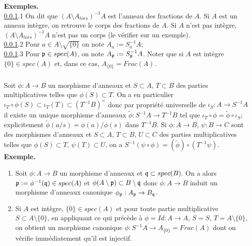 \documentclass[a4paper, 12pt]{amsart}
\begin{document}
 
 
 \subsubsection{}\label{LocEx2}\textbf{Exemples.}\\

\noindent\ref{LocEx2}.1 On dit que $(A\setminus A_{tors})^{-1}A$ est l'anneau des fractions de $A$. Si $A$ est un anneau int\`egre, on retrouve le corps  des fractions de $A$. Si $A$ n'est pas int\`egre, $(A\setminus A_{tors})^{-1}A$ n'est pas un corps (le v\'erifier sur un exemple).\\

\noindent\ref{LocEx2}.2 Pour $a\in A\setminus \sqrt{\lbrace 0\rbrace}$ on note $A_a:=S_a^{-1}A $;\\

\noindent\ref{LocEx2}.3 Pour $\frak{p}\in spec(A)$, on note $A_\frak{p}:=S_{\frak{p}}^{-1}A$. Noter que si $A$ est int\`egre  $\lbrace 0\rbrace \in spec(A)$ et, dans ce cas, $A_{\lbrace 0\rbrace}=Frac(A)$.\\

 \subsubsection{}\label{LocMorphismes}Soit $\phi:A\rightarrow B$ un morphisme d'anneaux et $S\subset A$, $T\subset B$ des parties multiplicatives telles que $\phi(S)\subset T$. On a en particulier $\iota_T\circ \phi(S)\subset \iota_T(T)\subset (T^{-1}B)^\times$ donc par propri\'et\'e universelle de $\iota_S:A\rightarrow S^{-1}A$ il existe un unique morphisme d'anneaux $\tilde{\phi}:S^{-1}A\rightarrow T^{-1}B$ tel que $\iota_T\circ \phi=\tilde{\phi}\circ \iota_S$; explicitement $\tilde{\phi}(a/s)=\phi(a)/\phi(s)$ dans $T^{-1}B$. Si $\phi:A\rightarrow B$, $\psi:B\rightarrow C$ sont des morphismes d'anneaux et $S\subset A$, $T\subset B$, $U\subset C$ des parties multiplicatives telles que $\phi(S)\subset T$, $\psi(T)\subset U$, on a $S^{-1}(\psi\circ \phi)=(\tilde{\phi})\circ (T^{-1}\psi)$. \\

\noindent\textbf{Exemple.} 

\begin{enumerate}
\item Soit $\phi:A\rightarrow B$ un morphisme d'anneaux et $\frak{q}\subset spec(B)$. On a alors $\frak{p}:=\phi^{-1}(\frak{q})\in spec(A)$ et $\phi(A\setminus \frak{p})\subset B\setminus \frak{q}$ donc $\phi:A\rightarrow B$ induit un morphisme d'anneaux canonique $\phi_\frak{p}:A_{\frak{p}}\rightarrow B_{\frak{q}}$. 
 \item Si $A$ est int\`egre,  $\lbrace 0\rbrace\in spec(A)$ et pour toute partie multiplicative $S\subset A\setminus \lbrace 0\rbrace$, en appliquant ce qui pr\'ec\`ede \`a $\phi=Id:A\rightarrow A$, $S=S$, $T=A\setminus \lbrace 0\rbrace$, on obtient un morphisme canonique $\phi:S^{-1}A\rightarrow A_{\lbrace 0\rbrace}=Frac(A)$ dont on v\'erifie imm\'ediatement qu'il est injectif. 
\end{enumerate}
\end{document}
